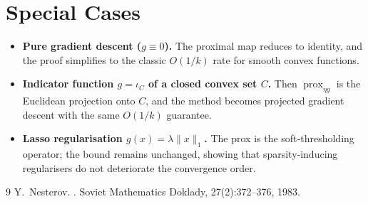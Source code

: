\documentclass{article}
\newcommand{\prox}{\operatorname{prox}}
\begin{document}
\section*{Special Cases}
\begin{itemize}
    \item \textbf{Pure gradient descent ($g\equiv0$).} The proximal map reduces to identity, and the proof simplifies to the classic $O(1/k)$ rate for smooth convex functions.
    \item \textbf{Indicator function $g=\iota_{C}$ of a closed convex set $C$.} Then $\prox_{\eta g}$ is the Euclidean projection onto $C$, and the method becomes projected gradient descent with the same $O(1/k)$ guarantee.
    \item \textbf{Lasso regularisation $g(x)=\lambda\|x\|_{1}$.} The prox is the soft‑thresholding operator; the bound remains unchanged, showing that sparsity‑inducing regularisers do not deteriorate the convergence order.
\end{itemize}

\begin{thebibliography}{9}
Y.~Nesterov.
.
\newblock Soviet Mathematics Doklady, 27(2):372–376, 1983.
\end{thebibliography}
\end{document}
